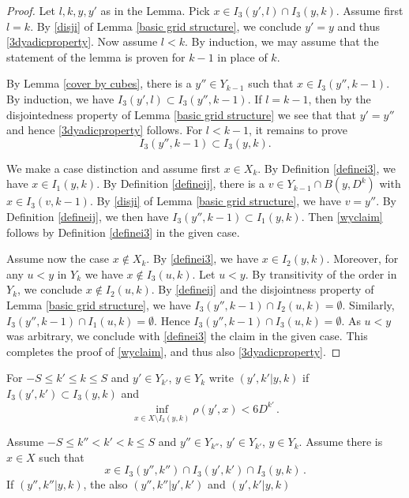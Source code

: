 \begin{proof}
Let $l,k,y,y'$ as in the Lemma.
Pick $x\in I_3(y',l)\cap I_3(y,k)$.
Assume first $l=k$. By \eqref{disji} of Lemma
\ref{basic grid structure}, we conclude $y'=y$
and thus \eqref{3dyadicproperty}.
Now assume $l<k$. By induction, we may assume
 that the statement of the lemma is proven for $k-1$ in place of $k$.

By Lemma \ref{cover by cubes}, there is
a $y''\in Y_{k-1}$ such that $x\in I_3(y'',k-1)$.
By induction, we have $I_3(y',l)\subset I_3(y'',k-1)$. If $l=k-1$, then by the disjointedness property
of Lemma \ref{basic grid structure} we see that
that $y'=y''$ and hence \eqref{3dyadicproperty} follows. For $l<k-1$, it remains to prove
\begin{equation}\label{wyclaim}
I_3(y'',k-1)\subset I_3(y,k).
\end{equation}

We make a case distinction and assume first $x\in X_k$.
By Definition \eqref{definei3}, we have
 $x\in I_1(y,k)$. By Definition \eqref{defineij}, there is a $v\in Y_{k-1}\cap B(y,D^k)$ with $x\in I_3(v,k-1)$.
By \eqref{disji} of Lemma \ref{basic grid structure}, we have $v=y''$.
By Definition \eqref{defineij}, we then have
$I_3(y'',k-1)\subset I_1(y,k)$.
Then \eqref{wyclaim} follows by Definition \eqref{definei3} in the given case.

Assume now the case $x\notin X_k$.
By \eqref{definei3}, we have
 $x\in I_2(y,k)$. Moreover, for any $u<y$ in
 $Y_k$ we have $x\not\in I_3(u,k)$.
 Let $u<y$. By transitivity of the order in $Y_k$, we conclude $x\not \in I_2(u,k)$.
By \eqref{defineij} and the disjointness property of Lemma \ref{basic grid structure}, we have
$I_3(y'',k-1)\cap  I_2(u,k)= \emptyset$.
Similarly, $I_3(y'',k-1)\cap  I_1(u,k)= \emptyset$.
Hence $I_3(y'',k-1)\cap  I_3(u,k)=\emptyset$.
As $u<y$ was arbitrary, we conclude with
\eqref{definei3} the claim in the given case.
This completes the proof of \eqref{wyclaim}, and thus also \eqref{3dyadicproperty}.
\end{proof}




For $-S\le k'\le k\le S$ and $y'\in Y_{k'}$, $y\in Y_k$
write  $(y',k'|y,k)$ if $I_3(y',k')\subset I_3(y,k)$ and
\begin{equation}\label{bdcond}
    \inf_{x\in X\setminus I_3(y,k)}\rho(y',x)<6D^{k'}\, .
\end{equation}


\begin{lemma}\label{transitive boundary}
Assume $-S\le k''< k'< k\le S$ and
$y''\in Y_{k''}$, $y'\in Y_{k'}$, $y\in Y_k$.
Assume there is $x\in X$ such that
\begin{equation}
x\in I_3(y'',k'')\cap I_3(y',k')\cap I_3(y,k)\, .
\end{equation}
If $(y'',k''|y,k)$, the also
$(y'',k''|y',k')$ and $(y',k'|y,k)$
\end{lemma}

